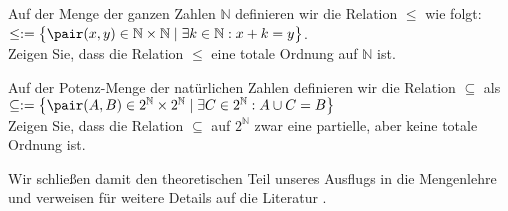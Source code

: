 \exercise
Auf der Menge der ganzen Zahlen $\mathbb{N}$ definieren wir die Relation $\leq$ 
wie folgt: 
\\[0.2cm]
\hspace*{1.3cm}
$\leq := \bigl\{ \pair(x,y) \in \mathbb{N} \times \mathbb{N} \mid \exists k \in \mathbb{N}: x + k = y \bigr\}$.
\\[0.2cm]
Zeigen Sie, dass die Relation $\leq$ eine totale Ordnung auf $\mathbb{N}$ ist.
\exend

\exercise
Auf der Potenz-Menge der natürlichen Zahlen definieren wir die Relation
$\subseteq$ als 
\\[0.2cm]
\hspace*{1.3cm}
$\subseteq := 
\bigl\{ \pair(A,B) \in 2^\mathbb{N} \times 2^\mathbb{N}\mid \exists C \in 2^\mathbb{N}: A \cup C = B \bigr\}$
\\[0.2cm]
Zeigen Sie, dass die Relation $\subseteq$ auf $2^\mathbb{N}$ zwar eine partielle, aber keine
totale Ordnung ist.
\exend
\next

\noindent
Wir schließen damit den theoretischen Teil unseres Ausflugs in die Mengenlehre und verweisen für weitere
Details auf die Literatur \cite{lipschutz:1998}.  

